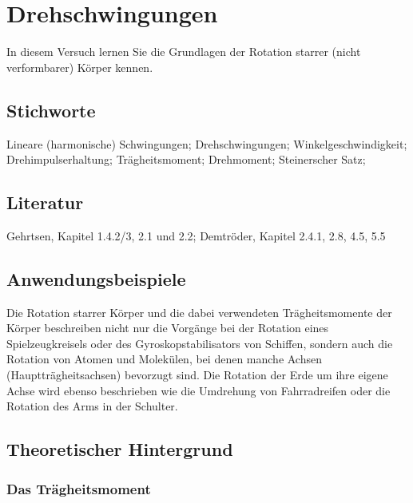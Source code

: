 \chapter{Drehschwingungen}
\label{v:2}

In diesem Versuch lernen Sie die Grundlagen der Rotation starrer (nicht verformbarer) Körper kennen.
\section{Stichworte}
Lineare (harmonische) Schwingungen; Drehschwingungen; Winkelgeschwindigkeit; Drehimpulserhaltung; Trägheitsmoment; Drehmoment; Steinerscher Satz; 
%
\section{Literatur}
Gehrtsen, Kapitel 1.4.2/3, 2.1 und 2.2; Demtröder, Kapitel 2.4.1, 2.8, 4.5, 5.5
%
\section{Anwendungsbeispiele}
%
Die Rotation starrer Körper und die dabei verwendeten Trägheitsmomente der Körper beschreiben nicht nur die Vorgänge bei der Rotation eines Spielzeugkreisels oder des Gyroskopstabilisators von Schiffen, sondern auch die Rotation von Atomen und Molekülen, bei denen manche Achsen (Hauptträgheitsachsen) bevorzugt sind. Die Rotation der Erde um ihre eigene Achse wird ebenso beschrieben wie die Umdrehung von Fahrradreifen oder die Rotation des Arms in der Schulter.
%
\section{Theoretischer Hintergrund}

\subsection{Das Trägheitsmoment}

